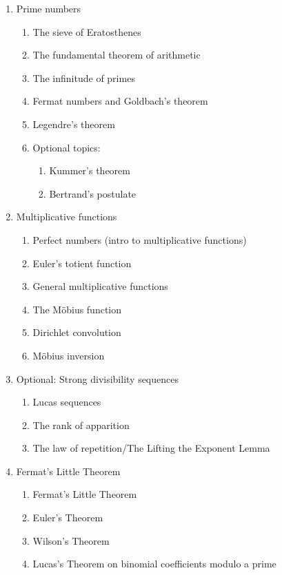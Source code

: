 \documentclass{article}
\begin{document}
\begin{enumerate}
  \begin{enumerate}
  \item Solving linear congruences
  \item The Chinese remainder theorem
  \end{enumerate}
\item Prime numbers
  \begin{enumerate}
  \item The sieve of Eratosthenes
  \item The fundamental theorem of arithmetic
  \item The infinitude of primes
  \item Fermat numbers and Goldbach's theorem
  \item Legendre's theorem
  \item Optional topics:
    \begin{enumerate}
    \item Kummer's theorem
    \item Bertrand's postulate
    \end{enumerate}
  \end{enumerate}
\item Multiplicative functions
  \begin{enumerate}
  \item Perfect numbers (intro to multiplicative functions)
  \item Euler's totient function
  \item General multiplicative functions
  \item The M\"obius function
  \item Dirichlet convolution
  \item M\"obius inversion
  \end{enumerate}
\item Optional: Strong divisibility sequences
  \begin{enumerate}
  \item Lucas sequences
  \item The rank of apparition
  \item The law of repetition/The Lifting the Exponent Lemma
  \end{enumerate}
\item Fermat's Little Theorem
  \begin{enumerate}
  \item Fermat's Little Theorem
  \item Euler's Theorem
  \item Wilson's Theorem
  \item Lucas's Theorem on binomial coefficients modulo a prime

\end{enumerate}
\end{enumerate}
\end{document}

